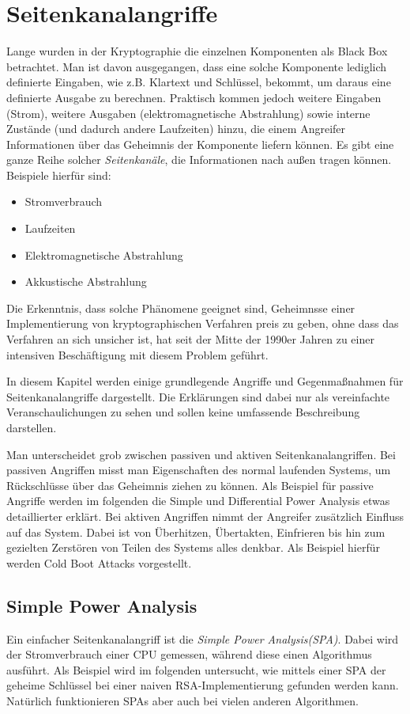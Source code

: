 \chapter{Seitenkanalangriffe}
\label{sec:seitenkanalangriffe}
Lange wurden in der Kryptographie die einzelnen Komponenten als Black
Box betrachtet. Man ist davon ausgegangen, dass eine solche Komponente
lediglich definierte Eingaben, wie z.B. Klartext und Schlüssel, bekommt,
um daraus eine definierte Ausgabe zu berechnen. Praktisch kommen jedoch
weitere Eingaben (Strom), weitere Ausgaben (elektromagnetische
Abstrahlung) sowie interne Zustände (und dadurch andere Laufzeiten)
hinzu, die einem Angreifer Informationen über das Geheimnis der
Komponente liefern können. Es gibt eine ganze Reihe solcher
\emph{Seitenkanäle}, die Informationen nach außen tragen
können. Beispiele hierfür sind:
\begin{itemize}
\item Stromverbrauch
\item Laufzeiten
\item Elektromagnetische Abstrahlung
\item Akkustische Abstrahlung
\end{itemize}

Die Erkenntnis, dass solche Phänomene geeignet sind, Geheimnsse einer
Implementierung von kryptographischen Verfahren preis zu geben, ohne
dass das Verfahren an sich unsicher ist, hat seit der Mitte der 1990er
Jahren zu einer intensiven Beschäftigung mit diesem Problem geführt. 

In diesem Kapitel werden einige grundlegende Angriffe und Gegenmaßnahmen
für Seitenkanalangriffe dargestellt. Die Erklärungen sind dabei nur als
vereinfachte Veranschaulichungen zu sehen und sollen keine umfassende
Beschreibung darstellen.

Man unterscheidet grob zwischen passiven und aktiven
Seitenkanalangriffen. Bei passiven Angriffen misst man Eigenschaften des
normal laufenden Systems, um Rückschlüsse über das Geheimnis ziehen zu
können. Als Beispiel für passive Angriffe werden im folgenden die Simple
und Differential Power Analysis etwas detaillierter erklärt. Bei aktiven
Angriffen nimmt der Angreifer zusätzlich Einfluss auf das System. Dabei
ist von Überhitzen, Übertakten, Einfrieren bis hin zum gezielten
Zerstören von Teilen des Systems alles denkbar. Als Beispiel hierfür
werden Cold Boot Attacks vorgestellt. 

\section{Simple Power Analysis}
\label{sec:simple-power-analys}
Ein einfacher Seitenkanalangriff ist die \emph{Simple Power
  Analysis(SPA)}. Dabei wird der Stromverbrauch einer CPU gemessen,
während diese einen Algorithmus ausführt. Als Beispiel wird im folgenden
untersucht, wie mittels einer SPA der geheime Schlüssel bei einer naiven
RSA-Implementierung gefunden werden kann. Natürlich funktionieren SPAs
aber auch bei vielen anderen Algorithmen.
